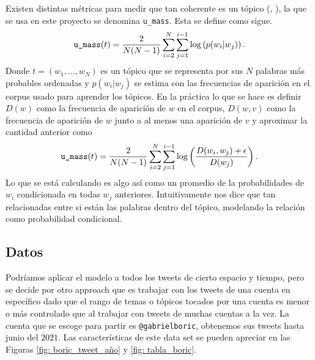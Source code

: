 \documentclass{article}
\begin{document}
	Existen distintas métricas para medir que tan coherente es un tópico (\cite{coherence}, \cite{coherence2}), la que se usa en este proyecto se denomina \texttt{u\_mass}. Esta se define como sigue.
	\begin{align*}
		\texttt{u\_mass}(t) = \frac{2}{N(N-1)} \sum_{i=2}^N\sum_{j=1}^{i-1}\log \left(p(w_i|w_j)\right).
	\end{align*}
	Donde $t = (w_1,...,w_N)$ es un tópico que se representa por sus $N$ palabras más probables ordenadas y $p(w_i|w_j)$ se estima con las frecuencias de aparición en el corpus usado para aprender los tópicos. En la práctica lo que se hace es definir $D(w)$ como la frecuencia de aparición de $w$ en el corpus, $D(w,v)$ como la frecuencia de aparición de $w$ junto a al menos una aparición de $v$ y aproximar la cantidad anterior como
	\begin{align*}
		\texttt{u\_mass}(t) = \frac{2}{N(N-1)} \sum_{i=2}^N\sum_{j=1}^{i-1}\log \left(\frac{D(w_i,w_j)+\epsilon}{D(w_j)}\right).
	\end{align*}
	Lo que se está calculando es algo así como un promedio de la probabilidades de $w_i$ condicionada en todas $w_j$ anteriores. Intuitivamente nos dice que tan relacionadas entre si están las palabras dentro del tópico, modelando la relación como probabilidad condicional.
\subsection{Datos}
	Podríamos aplicar el modelo a todos los tweets de cierto espacio y tiempo, pero se decide por otro approach que es trabajar con los tweets de una cuenta en específico dado que el rango de temas o tópicos tocados por una cuenta es menor o más controlado que al trabajar con tweets de muchas cuentas a la vez. La cuenta que se escoge para partir es \texttt{@gabrielboric}, obtenemos sus tweets hasta junio del $2021$. Las características de este data set se pueden apreciar en las Figuras \ref{fig: boric_tweet_año} y \ref{fig: tabla_boric}.

	
	
\end{document}
